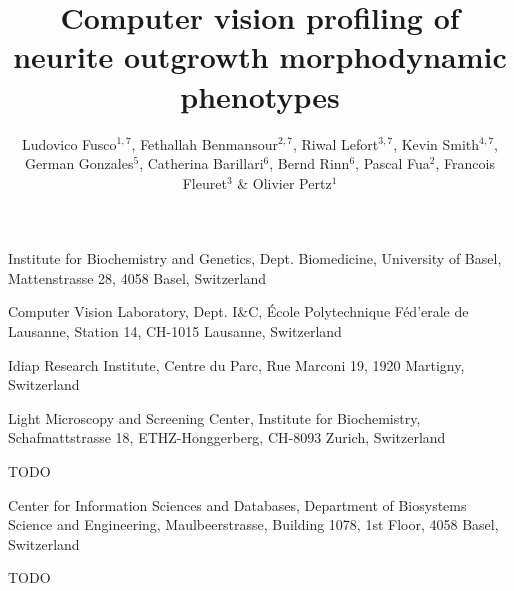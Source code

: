 \documentclass{nature}
\title{Computer vision profiling of neurite outgrowth morphodynamic phenotypes}
\author{Ludovico Fusco$^{1,7}$, Fethallah Benmansour$^{2, 7}$, Riwal Lefort$^{3, 7}$, Kevin Smith$^{4, 7}$, German Gonzales$^5$,  Catherina Barillari$^6$, Bernd Rinn$^6$, Pascal Fua$^2$, Francois Fleuret$^3$   \& Olivier Pertz$^1$}
\begin{document}
\maketitle

\begin{affiliations}
 \item Institute for Biochemistry and Genetics, Dept. Biomedicine, University of Basel, Mattenstrasse 28, 4058 Basel, Switzerland
 \item Computer Vision Laboratory, Dept. I\&C, \'Ecole Polytechnique F\'ed'erale de Lausanne, Station 14, CH-1015 Lausanne, Switzerland
 \item Idiap Research Institute, Centre du Parc, Rue Marconi 19, 1920 Martigny, Switzerland 
 \item Light Microscopy and Screening Center, Institute for Biochemistry, Schafmattstrasse 18, ETHZ-Honggerberg, CH-8093 Zurich, Switzerland
 \item TODO
\item Center for Information Sciences and Databases, Department of Biosystems Science and Engineering, Maulbeerstrasse, Building 1078, 1st Floor, 4058 Basel, Switzerland
\item TODO
\end{affiliations}






\begin{results}







\end{results}
\end{document}
